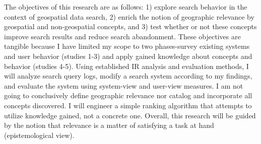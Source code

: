 The objectives of this research are as follows: 1) explore search behavior in the context of geospatial data search, 2) enrich the notion of geographic relevance by geospatial and non-geospatial concepts, and 3) test whether or not these concepts improve search results and reduce search abandonment. These objectives are tangible because I have limited my scope to two phases-survey existing systems and user behavior (studies 1-3) and apply gained knowledge about concepts and behavior (studies 4-5). Using established IR analysis and evaluation methods, I will analyze search query logs, modify a search system according to my findings, and evaluate the system using system-view and user-view measures. I am not going to conclusively define geographic relevance nor catalog and incorporate all concepts discovered. I will engineer a simple ranking algorithm that attempts to utilize knowledge gained, not a concrete one. Overall, this research will be guided by the notion that relevance is a matter of satisfying a task at hand (epistemological view).